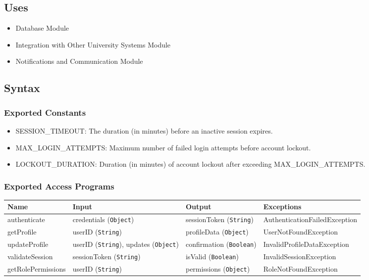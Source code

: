 \documentclass[12pt, titlepage]{article}
\begin{document}
\subsection{Uses}
\begin{itemize}
    \item Database Module
    \item Integration with Other University Systems Module
    \item Notifications and Communication Module
\end{itemize}

\subsection{Syntax}
\subsubsection{Exported Constants}
\begin{itemize}
    \item SESSION\_TIMEOUT: The duration (in minutes) before an inactive session expires.
    \item MAX\_LOGIN\_ATTEMPTS: Maximum number of failed login attempts before account lockout.
    \item LOCKOUT\_DURATION: Duration (in minutes) of account lockout after exceeding MAX\_LOGIN\_ATTEMPTS.
\end{itemize}

\subsubsection{Exported Access Programs}

\begin{center}
    \begin{tabular}{|p{3cm}|p{4cm}|p{4cm}|p{4cm}|}
        \hline
        \textbf{Name} & \textbf{Input} & \textbf{Output} & \textbf{Exceptions} \\
        \hline
        authenticate & credentials (\texttt{Object}) & sessionToken (\texttt{String}) & AuthenticationFailedException \\
        \hline
        getProfile & userID (\texttt{String}) & profileData (\texttt{Object}) & UserNotFoundException \\
        \hline
        updateProfile & userID (\texttt{String}), updates (\texttt{Object}) & confirmation (\texttt{Boolean}) & InvalidProfileDataException \\
        \hline
        validateSession & sessionToken (\texttt{String}) & isValid (\texttt{Boolean}) & InvalidSessionException \\
        \hline
        getRolePermissions & userID (\texttt{String}) & permissions (\texttt{Object}) & RoleNotFoundException \\
        \hline
    \end{tabular}
\end{center}
\end{document}
